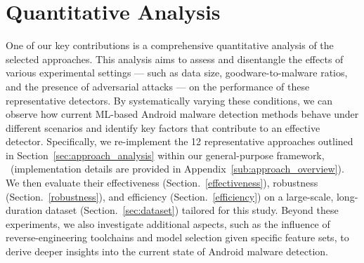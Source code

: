 \section{Quantitative Analysis}
\label{sec:evaluation}




%

One of our key contributions is a comprehensive quantitative analysis of the selected approaches.
This analysis aims to assess and disentangle the effects of various experimental settings --- such as data size, goodware-to-malware ratios, and the presence of adversarial attacks --- on the performance of these representative detectors.
By systematically varying these conditions, we can observe how current ML-based Android malware detection methods behave under different scenarios and identify key factors that contribute to an effective detector.
Specifically, we re-implement the 12 representative approaches outlined in Section~\ref{sec:approach_analysis} within our general-purpose framework, \codename\ (implementation details are provided in Appendix~\ref{sub:approach_overview}).
We then evaluate their effectiveness (Section.~\ref{effectiveness}), robustness (Section.~\ref{robustness}), and efficiency (Section.~\ref{efficiency}) on a large-scale, long-duration dataset (Section.~\ref{sec:dataset}) tailored for this study.
Beyond these experiments, we also investigate additional aspects, such as the influence of reverse-engineering toolchains and model selection given specific feature sets, to derive deeper insights into the current state of Android malware detection.

